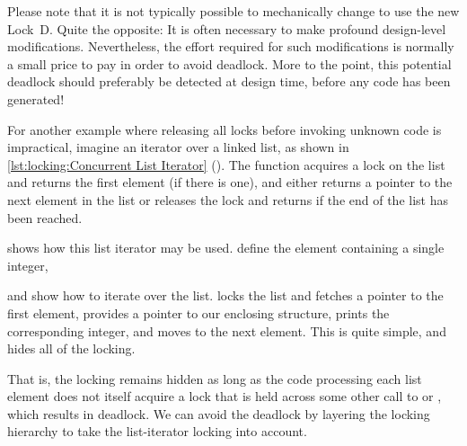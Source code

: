 \begin{listing}

\caption{Concurrent List Iterator}
\label{lst:locking:Concurrent List Iterator}
\end{listing}

Please note that it is not typically possible to mechanically
change  to use the new Lock~D\@.
Quite the opposite:
It is often necessary to make profound design-level modifications.
Nevertheless, the effort required for such modifications is normally
a small price to pay in order to avoid deadlock.
More to the point, this potential deadlock should preferably be detected
at design time, before any code has been generated!

For another example where releasing all locks before invoking unknown
code is impractical, imagine an iterator over a linked list, as shown in
\cref{lst:locking:Concurrent List Iterator} ().
The  function acquires a lock on the list and returns
the first element (if there is one), and
 either returns a pointer to the next element in the list
or releases the lock and returns  if the end of the list has
been reached.

\begin{listing}

\caption{Concurrent List Iterator Usage}
\label{lst:locking:Concurrent List Iterator Usage}
\end{listing}

\begin{fcvref}
 shows how
this list iterator may be used.
 define the  element
containing a single integer,
\end{fcvref}
\begin{fcvref}
and  show how to iterate over the list.
 locks the list and fetches a pointer to the first element,
 provides a pointer to our enclosing  structure,
 prints the corresponding integer, and
 moves to the next element.
This is quite simple, and hides all of the locking.
\end{fcvref}

That is, the locking remains hidden as long as the code processing each
list element does not itself acquire a lock that is held across some
other call to  or , which results in
deadlock.
We can avoid the deadlock by layering the locking hierarchy
to take the list-iterator locking into account.

